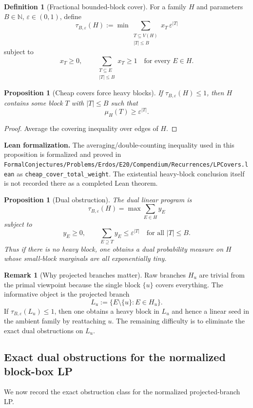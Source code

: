 \documentclass[11pt]{article}
\newtheorem{proposition}[theorem]{Proposition}
\theoremstyle{definition}
\newtheorem{definition}[theorem]{Definition}
\newtheorem{remark}[theorem]{Remark}
\newcommand{\eps}{\varepsilon}
\newcommand{\N}{\mathbb{N}}
\newcommand{\1}{\mathbf{1}}
\newcommand{\leannote}[1]{\par\smallskip\noindent\textbf{Lean formalization.} #1\par\smallskip}
\begin{document}
\begin{definition}[Fractional bounded-block cover]
For a family $H$ and parameters $B\in\N$, $\eps\in(0,1)$, define
\[
\tau_{B,\eps}(H):=\min \sum_{\substack{T\subseteq V(H)\\ |T|\le B}} x_T\,\eps^{|T|}
\]
subject to
\[
x_T\ge 0,
\qquad
\sum_{\substack{T\subseteq E\\ |T|\le B}} x_T\ge 1
\quad\text{for every }E\in H.
\]
\end{definition}

\begin{proposition}[Cheap covers force heavy blocks]
If $\tau_{B,\eps}(H)\le 1$, then $H$ contains some block $T$ with $|T|\le B$ such that
\[
\mu_H(T)\ge \eps^{|T|}.
\]
\end{proposition}

\begin{proof}
Average the covering inequality over edges of $H$.
\end{proof}

\leannote{The averaging/double-counting inequality used in this proposition is formalized and proved in \texttt{FormalConjectures/Problems/Erdos/E20/Compendium/Recurrences/LPCovers.lean} as \texttt{cheap\_cover\_total\_weight}. The existential heavy-block conclusion itself is not recorded there as a completed Lean theorem.}

\begin{proposition}[Dual obstruction]
The dual linear program is
\[
\tau_{B,\eps}(H)=\max \sum_{E\in H} y_E
\]
subject to
\[
y_E\ge 0,
\qquad
\sum_{E\supseteq T} y_E\le \eps^{|T|}
\quad\text{for all }|T|\le B.
\]
Thus if there is no heavy block, one obtains a dual probability measure on $H$ whose small-block marginals are all exponentially tiny.
\end{proposition}

\begin{remark}[Why projected branches matter]
Raw branches $H_u$ are trivial from the primal viewpoint because the single block $\{u\}$ covers everything. The informative object is the projected branch
\[
L_u:=\{E\setminus \{u\}: E\in H_u\}.
\]
If $\tau_{B,\eps}(L_u)\le 1$, then one obtains a heavy block in $L_u$ and hence a linear seed in the ambient family by reattaching $u$. The remaining difficulty is to eliminate the exact dual obstructions on $L_u$.
\end{remark}

\subsection*{Exact dual obstructions for the normalized block-box LP}
We now record the exact obstruction class for the normalized projected-branch LP.
\end{document}

